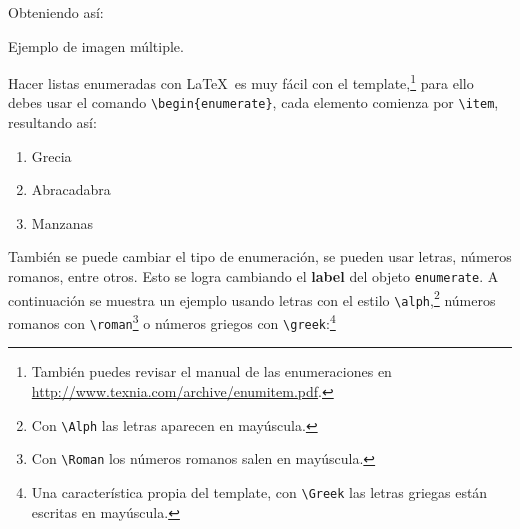 	Obteniendo así:

	\begin{images}{Ejemplo de imagen múltiple.}
		\imagesnewline
	\end{images}


\newpage



		Hacer listas enumeradas con \LaTeX\ es muy fácil con el template,\footnote{También puedes revisar el manual de las enumeraciones en \url{http://www.texnia.com/archive/enumitem.pdf}.} para ello debes usar el comando \texttt{\textbackslash begin\{enumerate\}}, cada elemento comienza por \texttt{\textbackslash item}, resultando así:

		\begin{enumerate}
			\item Grecia
			\item Abracadabra
			\item Manzanas
		\end{enumerate}

		También se puede cambiar el tipo de enumeración, se pueden usar letras, números romanos, entre otros. Esto se logra cambiando el \textbf{label} del objeto \texttt{enumerate}. A continuación se muestra un ejemplo usando letras con el estilo \texttt{\textbackslash alph},\footnote{Con \texttt{\textbackslash Alph} las letras aparecen en mayúscula.} números romanos con \texttt{\textbackslash roman}\footnote{Con \texttt{\textbackslash Roman} los números romanos salen en mayúscula.} o números griegos con \texttt{\textbackslash greek}:\footnote{Una característica propia del template, con \texttt{\textbackslash Greek} las letras griegas están escritas en mayúscula.}

